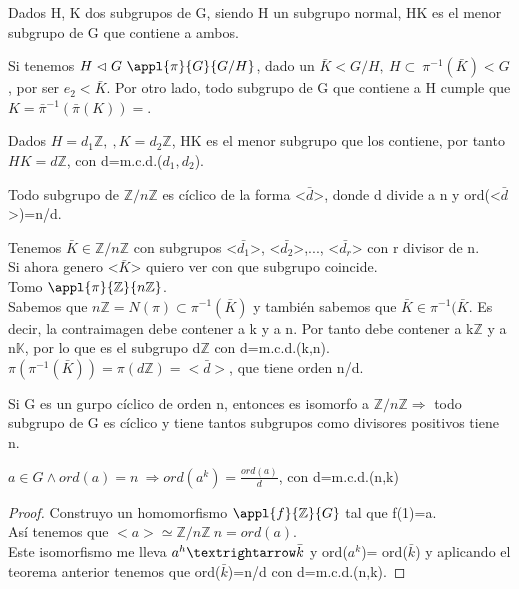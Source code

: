 \documentclass[nochap]{apuntes}
\begin{document}
\begin{defn}
Dados H, K dos subgrupos de G, siendo H un subgrupo normal, HK es el menor subgrupo de G que contiene a ambos.
\end{defn}

 Si tenemos $H \vartriangleleft G \ \appl{\pi}{G}{G/H}$, dado un $\bar{K} < G/H, \  H \subset \ \pi^{-1}(\bar{K}) < G $, por ser $e_2 < \bar{K}$. Por otro lado, todo subgrupo de G que contiene a H cumple que $K=\bar{\pi}^{-1}(\bar{\pi}(K))=$.
 
 \begin{example}
  Dados $H=d_1\mathbb{Z}, \ , K=d_2\mathbb{Z}$, HK es el menor subgrupo que los contiene, por tanto $HK=d\mathbb{Z}$, con d=m.c.d.($d_1, d_2$).
 \end{example}

 \begin{theorem}
  Todo subgrupo de $\mathbb{Z}/n\mathbb{Z}$  es cíclico de la forma <$\bar{d}$>, donde d divide a n y ord(<$\bar{d}$>)=n/d.
 \end{theorem}
\begin{example}
 Tenemos $\bar{K}\in \mathbb{Z}/n\mathbb{Z}$  con subgrupos <$\bar{d_1}$>, <$\bar{d_2}$>,..., <$\bar{d_r}$> con r divisor de n.\\
 Si ahora genero <$\bar{K}$> quiero ver con que subgrupo coincide.\\
 Tomo $\appl{\pi}{\mathbb{Z}}{n\mathbb{Z}}$.\\
 Sabemos que $n\mathbb{Z}=N(\pi) \subset \pi^{-1}(\bar{K})$  y también sabemos que $\bar{K} \in \pi^{-1}(\bar{K}$. Es decir,
 la contraimagen debe contener a k y a n. Por tanto debe contener a k$\mathbb{Z}$  y a n$\mathbb{K}$, por lo que es el subgrupo
 d$\mathbb{Z}$  con d=m.c.d.(k,n).\\
 $\pi(\pi^{-1}(\bar{K}))=\pi(d\mathbb{Z})=<\bar{d}>$, que tiene orden n/d.
\end{example}

Si G es un gurpo cíclico de orden n, entonces es isomorfo a $\mathbb{Z}/n\mathbb{Z} \Rightarrow$  todo subgrupo de G es cíclico y 
tiene tantos subgrupos como divisores positivos tiene n.

\begin{theorem}
 $a\in G \wedge ord(a)=n \ \Rightarrow ord(a^{k})=\frac{ord(a)}{d}$, con d=m.c.d.(n,k)
\end{theorem}

\begin{proof}
 Construyo un homomorfismo $\appl{f}{\mathbb{Z}}{G}$  tal que f(1)=a. \\
 Así tenemos que $<a>\simeq \mathbb{Z}/n\mathbb{Z} \ n=ord(a)$.\\
 Este isomorfismo me lleva $a^{h}\textrightarrow \bar{k}$  y ord($a^{k}$)= ord($\bar{k}$) y  aplicando el teorema anterior tenemos
 que ord($\bar{k}$)=n/d con d=m.c.d.(n,k).
\end{proof}
\end{document}
